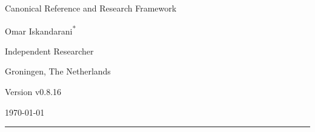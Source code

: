 \documentclass[11pt]{article}
\theoremstyle{definition}
\theoremstyle{plain}
\theoremstyle{remark}
\begin{document}
    
    \thispagestyle{empty}

    \begin{center}
        \vspace*{0.06\textheight}

        {\LARGE\bfseries \papertitle\par}
        \vspace{0.45cm}

        {\large Canonical Reference and Research Framework\par}
        \vspace{1.0cm}

        {\Large Omar Iskandarani\textsuperscript{*}\par}
        \vspace{0.35cm}

        {\normalsize Independent Researcher\par}
        {\normalsize Groningen, The Netherlands\par}
        \vspace{0.6cm}

        {\normalsize Version v0.8.16\par}
        {\normalsize \today\par}
        \vspace{0.9cm}

        \rule{0.82\textwidth}{0.5pt}
        \vspace{0.7cm}
    \end{center}

    \begin{abstract}
        \noindent
        This document presents Swirl-String Theory (SST) as a structured canonical synthesis rather than as a claim that every phenomenological sector has already been derived to theorem level. The text consolidates the primitive constant chain linking the effective fluid density, characteristic swirl speed, Compton anchoring, and horn/circulation scale; records delay-induced mode selection as the preferred non-operator route to spectral discreteness; and organizes the atomic bridge, spectroscopic filter, relational-time sector, and topology-based mass program within one explicitly stratified framework. Throughout, orthodox inputs, SST-internal derivations, bridge-level constructions, and conjectural extensions are kept distinct so that the canon remains internally coherent, externally comparable, and open to falsification.
    \end{abstract}
\end{document}
